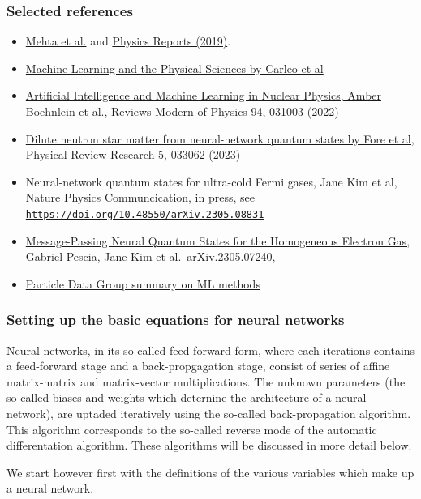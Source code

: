 \documentclass{beamer}
\begin{document}
\begin{frame}
\frametitle{Selected references}

\begin{block}{}
\begin{itemize}
\item \href{{https://arxiv.org/abs/1803.08823}}{Mehta et al.} and \href{{https://www.sciencedirect.com/science/article/pii/S0370157319300766?via%3Dihub}}{Physics Reports (2019)}.

\item \href{{https://link.aps.org/doi/10.1103/RevModPhys.91.045002}}{Machine Learning and the Physical Sciences by Carleo et al}

\item \href{{https://journals.aps.org/rmp/abstract/10.1103/RevModPhys.94.031003}}{Artificial Intelligence and Machine Learning in Nuclear Physics, Amber Boehnlein et al., Reviews Modern of Physics 94, 031003 (2022)} 

\item \href{{https://journals.aps.org/prresearch/pdf/10.1103/PhysRevResearch.5.033062}}{Dilute neutron star matter from neural-network quantum states by Fore et al, Physical Review Research 5, 033062 (2023)}

\item Neural-network quantum states for ultra-cold Fermi gases, Jane Kim et al, Nature Physics Communcication, in press, see \href{{https://doi.org/10.48550/arXiv.2305.08831}}{\nolinkurl{https://doi.org/10.48550/arXiv.2305.08831}}

\item \href{{https://doi.org/10.48550/arXiv.2305.07240}}{Message-Passing Neural Quantum States for the Homogeneous Electron Gas, Gabriel Pescia, Jane Kim et al.~arXiv.2305.07240,}

\item \href{{https://pdg.lbl.gov/2021/reviews/rpp2021-rev-machine-learning.pdf}}{Particle Data Group summary on ML methods}
\end{itemize}

\noindent
\end{block}
\end{frame}

\begin{frame}
\frametitle{Setting up the basic equations for neural networks}

Neural networks, in its so-called feed-forward form, where each
iterations contains a feed-forward stage and a back-propgagation
stage, consist of series of affine matrix-matrix and matrix-vector
multiplications. The unknown parameters (the so-called biases and
weights which deternine the architecture of a neural network), are
uptaded iteratively using the so-called back-propagation algorithm.
This algorithm corresponds to the so-called reverse mode of the
automatic differentation algorithm. These algorithms will be discussed
in more detail below.

We start however first with the  definitions of the various variables which make up a neural network.
\end{frame}
\end{document}
